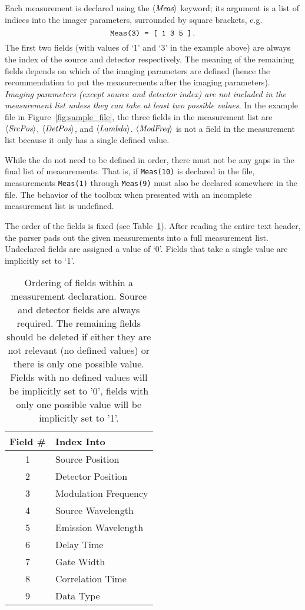 \documentclass[12pt]{article}
\newcommand{\keyword}[1]{\mbox{$\left<\mbox{\it #1}\right>$}\/}
\begin{document}
Each measurement is declared using the \keyword{Meas} keyword; its
argument is a list of indices into the imager parameters, surrounded by
square brackets, e.g.
\[
\mbox{\tt Meas(3) = [ 1 3 5 ].}
\]
The first two fields (with values of `1' and `3' in the example above)
are always the index of the source and detector respectively.  The
meaning of the remaining fields depends on which of the imaging
parameters are defined (hence the recommendation to put the
measurements after the imaging parameters).  {\it Imaging parameters
(except source and detector index) are not included in the measurement
list unless they can take at least two possible values}.  In the
example file in Figure~\ref{fig:sample_file}, the three fields in the
measurement list are \keyword{SrcPos}, \keyword{DetPos}, and
\keyword{Lambda}.  \keyword{ModFreq} is not a field in the
measurement list because it only has a single defined value.

While the do not need to be defined in order, there must not be any
gaps in the final list of measurements.  That is, if {\tt Meas(10)} is
declared in the file, measurements {\tt Meas(1)} through {\tt Meas(9)}
must also be declared somewhere in the file.  The behavior of the
toolbox when presented with an incomplete measurement list is
undefined.

The order of the fields is fixed (see Table~\ref{tbl:mlorder}).  After
reading the entire text header, the parser pads out the given
measurements into a full measurement list.  Undeclared fields are
assigned a value of `0'.  Fields that take a single value are
implicitly set to `1'.

\begin{table}
\begin{center}
\begin{tabular}{|c|l|}
\hline
Field \# & Index Into \\ \hline
\hline
1 & Source Position       \\ \hline
2 & Detector Position     \\ \hline
3 & Modulation Frequency  \\ \hline
4 & Source  Wavelength    \\ \hline
5 & Emission Wavelength   \\ \hline
6 & Delay Time            \\ \hline
7 & Gate Width            \\ \hline
8 & Correlation Time      \\ \hline
9 & Data Type             \\ \hline
\end{tabular}
\end{center}
\caption{Ordering of fields within a measurement declaration.  Source
and detector fields are always required.  The remaining fields should
be deleted if either they are not relevant (no defined values) or
there is only one possible value. Fields with no defined values will
be implicitly set to '0', fields with only one possible value will be
implicitly set to '1'.}
\label{tbl:mlorder}
\end{table}
\end{document}
